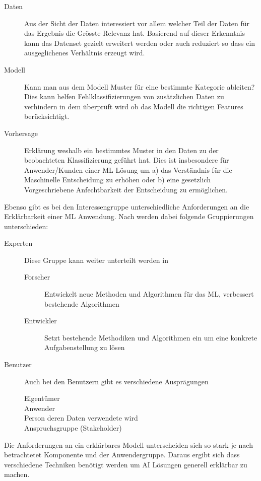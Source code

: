 \documentclass[
  12pt, %
  a4paper, %
  oneside, %
  openany, 
  numbers=noenddot, %
  BCOR=5mm, %
  parskip=half*, %
  thesis, %
]{bfhbook}
\begin{document}
\begin{description}
\item[Daten]
Aus der Sicht der Daten interessiert vor allem welcher Teil der Daten für das Ergebnis die Grösste Relevanz hat. Basierend auf dieser Erkenntnis kann das Datenset gezielt erweitert werden oder auch reduziert so dass ein ausgeglichenes Verhältnis erzeugt wird.

\item[Modell]
Kann man aus dem Modell Muster für eine bestimmte Kategorie ableiten? Dies kann helfen Fehlklassifizierungen von zusätzlichen Daten zu verhindern in dem überprüft wird ob das Modell die richtigen Features berücksichtigt.

\item[Vorhersage]
Erklärung weshalb ein bestimmtes Muster in den Daten zu der beobachteten Klassifizierung geführt hat. Dies ist insbesondere für Anwender/Kunden einer ML Lösung um a) das Verständnis für die Maschinelle Entscheidung zu erhöhen oder b) eine gesetzlich Vorgeschriebene Anfechtbarkeit der Entscheidung zu ermöglichen.
\end{description}

Ebenso gibt es bei den Interessengruppe unterschiedliche Anforderungen an die Erklärbarkeit einer ML Anwendung. Nach \parencite{Ras2018} werden dabei folgende Gruppierungen unterschieden:
\begin{description}
  \item[Experten]
  Diese Gruppe kann weiter unterteilt werden in
  	\begin{description}
  		\item[Forscher] Entwickelt neue Methoden und Algorithmen für das ML, verbessert bestehende Algorithmen
  		\item[Entwickler] Setzt bestehende Methodiken und Algorithmen ein um eine konkrete Aufgabenstellung zu lösen
	\end{description}
  \item[Benutzer]
  Auch bei den Benutzern gibt es verschiedene Ausprägungen
  	\begin{description}
  		\item[Eigentümer]
  		\item[Anwender]
  		\item[Person deren Daten verwendete wird]
  		\item[Anspruchsgruppe (Stakeholder)]
	\end{description}
\end{description}
Die Anforderungen an ein erklärbares Modell unterscheiden sich so stark je nach betrachtetet Komponente und der Anwendergruppe. Daraus ergibt sich dass verschiedene Techniken benötigt werden um AI Lösungen generell erklärbar zu machen.
\end{document}
